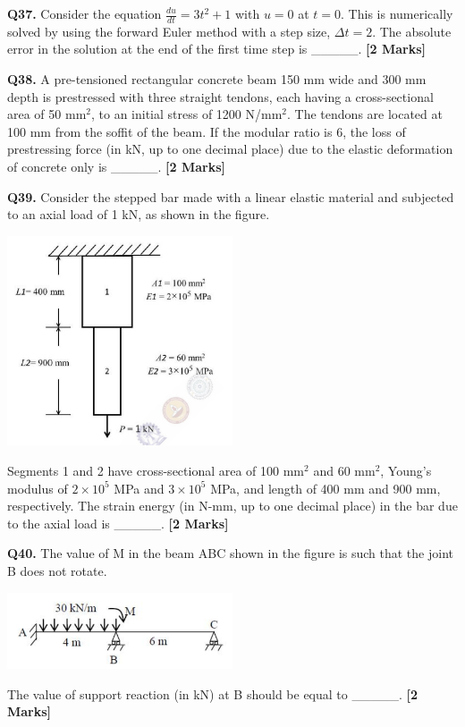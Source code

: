 \documentclass[11pt]{article}
\newcommand{\questionb}[2]{
    \noindent\textbf{Q#2.} #1 \hfill \textbf{[2 Marks]}
}
\begin{document}
\vspace{0.5cm}

\questionb{Consider the equation $\frac{du}{dt} = 3t^2 + 1$ with $u = 0$ at $t = 0$. This is numerically solved by using the forward Euler method with a step size, $\Delta t = 2$. The absolute error in the solution at the end of the first time step is \_\_\_\_\_.}{37}

\vspace{0.5cm}

\questionb{A pre-tensioned rectangular concrete beam 150 mm wide and 300 mm depth is prestressed with three straight tendons, each having a cross-sectional area of 50 mm$^2$, to an initial stress of 1200 N/mm$^2$. The tendons are located at 100 mm from the soffit of the beam. If the modular ratio is 6, the loss of prestressing force (in kN, up to one decimal place) due to the elastic deformation of concrete only is \_\_\_\_\_.}{38}

\vspace{0.5cm}

\questionb{Consider the stepped bar made with a linear elastic material and subjected to an axial load of 1 kN, as shown in the figure. 
\begin{center}
\includegraphics[width=0.5\textwidth]{figures/39.png}
\end{center}
Segments 1 and 2 have cross-sectional area of 100 mm$^2$ and 60 mm$^2$, Young's modulus of $2 \times 10^5$ MPa and $3 \times 10^5$ MPa, and length of 400 mm and 900 mm, respectively. The strain energy (in N-mm, up to one decimal place) in the bar due to the axial load is \_\_\_\_\_.}{39}

\vspace{0.5cm}

\questionb{The value of M in the beam ABC shown in the figure is such that the joint B does not rotate.
\begin{center}
\includegraphics[width=0.5\textwidth]{figures/40.png}
\end{center}
The value of support reaction (in kN) at B should be equal to \_\_\_\_\_.}{40}
\end{document}
